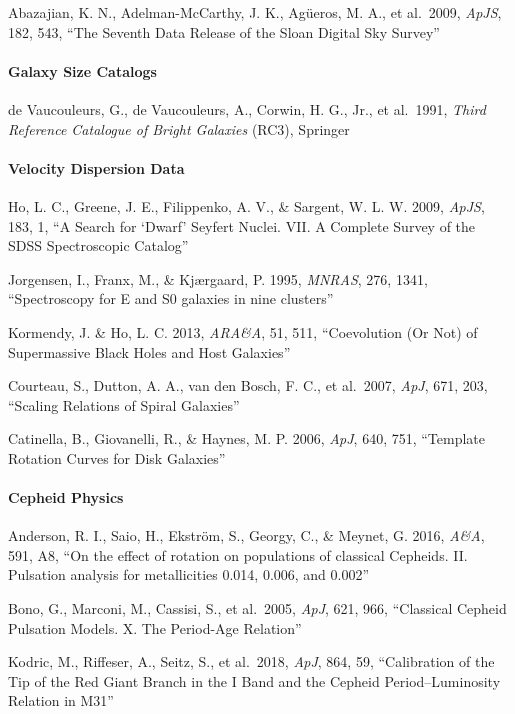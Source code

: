 \documentclass[
]{article}
\begin{document}
Abazajian, K. N., Adelman-McCarthy, J. K., Agüeros, M. A., et al.~2009,
\emph{ApJS}, 182, 543, ``The Seventh Data Release of the Sloan Digital
Sky Survey''

\paragraph{Galaxy Size Catalogs}\label{galaxy-size-catalogs}

de Vaucouleurs, G., de Vaucouleurs, A., Corwin, H. G., Jr., et al.~1991,
\emph{Third Reference Catalogue of Bright Galaxies} (RC3), Springer

\paragraph{Velocity Dispersion Data}\label{velocity-dispersion-data}

Ho, L. C., Greene, J. E., Filippenko, A. V., \& Sargent, W. L. W. 2009,
\emph{ApJS}, 183, 1, ``A Search for `Dwarf' Seyfert Nuclei. VII. A
Complete Survey of the SDSS Spectroscopic Catalog''

Jorgensen, I., Franx, M., \& Kjærgaard, P. 1995, \emph{MNRAS}, 276,
1341, ``Spectroscopy for E and S0 galaxies in nine clusters''

Kormendy, J. \& Ho, L. C. 2013, \emph{ARA\&A}, 51, 511, ``Coevolution
(Or Not) of Supermassive Black Holes and Host Galaxies''

Courteau, S., Dutton, A. A., van den Bosch, F. C., et al.~2007,
\emph{ApJ}, 671, 203, ``Scaling Relations of Spiral Galaxies''

Catinella, B., Giovanelli, R., \& Haynes, M. P. 2006, \emph{ApJ}, 640,
751, ``Template Rotation Curves for Disk Galaxies''

\paragraph{Cepheid Physics}\label{cepheid-physics}

Anderson, R. I., Saio, H., Ekström, S., Georgy, C., \& Meynet, G. 2016,
\emph{A\&A}, 591, A8, ``On the effect of rotation on populations of
classical Cepheids. II. Pulsation analysis for metallicities 0.014,
0.006, and 0.002''

Bono, G., Marconi, M., Cassisi, S., et al.~2005, \emph{ApJ}, 621, 966,
``Classical Cepheid Pulsation Models. X. The Period-Age Relation''

Kodric, M., Riffeser, A., Seitz, S., et al.~2018, \emph{ApJ}, 864, 59,
``Calibration of the Tip of the Red Giant Branch in the I Band and the
Cepheid Period--Luminosity Relation in M31''
\end{document}
